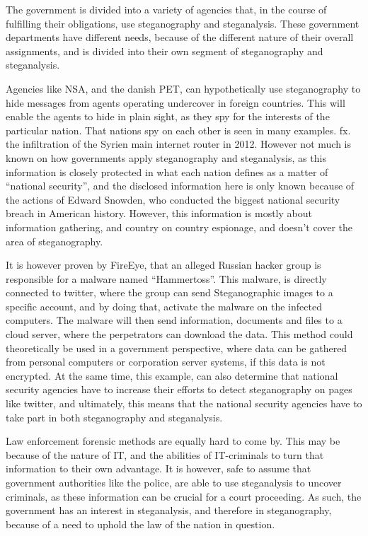 The government is divided into a variety of agencies that, in the course of fulfilling their obligations, use steganography and steganalysis. These government departments have different needs, because of the different nature of their overall assignments, and is divided into their own segment of steganography and steganalysis.

Agencies like NSA, and the danish PET, can hypothetically use steganography to hide messages from agents operating undercover in foreign countries. This will enable the agents to hide in plain sight, as they spy for the interests of the particular nation. That nations spy on each other is seen in many examples. fx. the infiltration of the Syrien main internet router in 2012. However not much is known on how governments apply steganography and steganalysis, as this information is closely protected in what each nation defines as a matter of “national security”, and the disclosed information here is only known because of the actions of Edward Snowden, who conducted the biggest national security breach in American history.\cite{governmentsurveillance} However, this information is mostly about information gathering, and country on country espionage, and doesn’t cover the area of steganography.

It is however proven by FireEye, that an alleged Russian hacker group is responsible for a malware named “Hammertoss”.\cite{spionertwitter} This malware, is directly connected to twitter, where the group can send Steganographic images to a specific account, and by doing that, activate the malware on the infected computers. The malware will then send information, documents and files to a cloud server, where the perpetrators can download the data. This method could theoretically be used in a government perspective, where data can be gathered from personal computers or corporation server systems, if this data is not encrypted.
At the same time, this example, can also determine that national security agencies have to increase their efforts to detect steganography on pages like twitter, and ultimately, this means that the national security agencies have to take part in both steganography and steganalysis.

Law enforcement forensic methods are equally hard to come by. This may be because of the nature of IT, and the abilities of IT-criminals to turn that information to their own advantage. It is however, safe to assume that government authorities like the police, are able to use steganalysis to uncover criminals, as these information can be crucial for a court proceeding.
As such, the government has an interest in steganalysis, and therefore in steganography, because of a need to uphold the law of the nation in question.